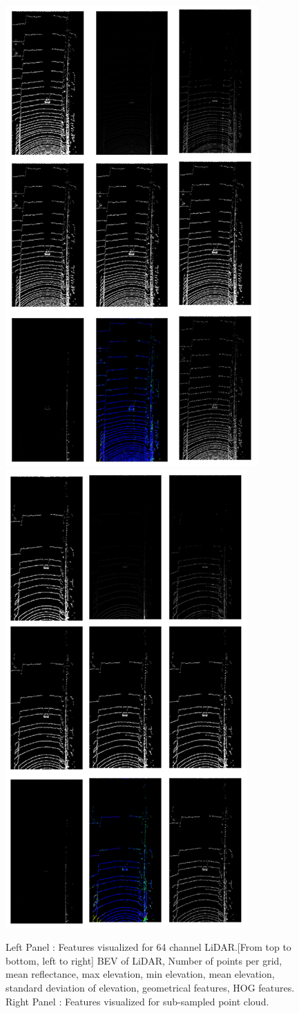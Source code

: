 \documentclass[10pt,twocolumn,letterpaper]{article}
\begin{document}
\begin{figure}
    \centering
    \includegraphics[width=0.465\linewidth]{features__new.png}
    \includegraphics[width=0.45\linewidth]{sub_sample_features__new.png}
    \caption{Left Panel : Features visualized for 64 channel LiDAR.[From top to bottom, left to right] BEV of LiDAR, Number of points per grid, mean reflectance, max elevation, min elevation, mean elevation, standard deviation of elevation, geometrical features, HOG features. Right Panel : Features visualized for sub-sampled point cloud.}
    \label{fig:pointcloud_features}
\end{figure}
\end{document}
